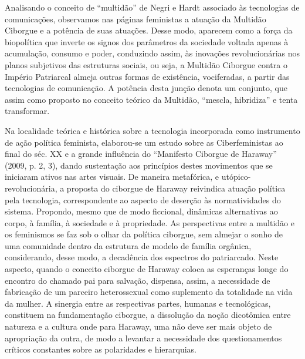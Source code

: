 Analisando o conceito de ``multidão'' de Negri e Hardt associado às
tecnologias de comunicações, observamos nas páginas feministas a atuação
da Multidão Ciborgue e a potência de suas atuações. Desse modo, aparecem
como a força da biopolítica que inverte os signos dos parâmetros da
sociedade voltada apenas à acumulação, consumo e poder, conduzindo
assim, às inovações revolucionárias nos planos subjetivos das estruturas
sociais, ou seja, a Multidão Ciborgue contra o Império Patriarcal almeja
outras formas de existência, vociferadas, a partir das tecnologias de
comunicação. A potência desta junção denota um conjunto, que assim como
proposto no conceito teórico da Multidão, ``mescla, hibridiza'' e tenta
transformar.

Na localidade teórica e histórica sobre a tecnologia incorporada como
instrumento de ação política feminista, elaborou-se um estudo sobre as
Ciberfeministas ao final do séc. XX e a grande influência do ``Manifesto
Ciborgue de Haraway'' (2009, p. 2, 3), dando sustentação aos princípios
destes movimentos que se iniciaram ativos nas artes visuais. De maneira
metafórica, e utópico-revolucionária, a proposta do ciborgue de Haraway
reivindica atuação política pela tecnologia, correspondente ao aspecto
de deserção às normatividades do sistema. Propondo, mesmo que de modo
ficcional, dinâmicas alternativas ao corpo, à família, à sociedade e à
propriedade. As perspectivas entre a multidão e os feminismos se faz sob
o olhar da política ciborgue, sem almejar o sonho de uma comunidade
dentro da estrutura de modelo de família orgânica, considerando, desse
modo, a decadência dos espectros do patriarcado. Neste aspecto, quando o
conceito ciborgue de Haraway coloca as esperanças longe do encontro do
chamado pai para salvação, dispensa, assim, a necessidade de fabricação
de um parceiro heterossexual como suplemento da totalidade na vida da
mulher. A sinergia entre as respectivas partes, humanas e tecnológicas,
constituem na fundamentação ciborgue, a dissolução da noção dicotômica
entre natureza e a cultura onde para Haraway, uma não deve ser mais
objeto de apropriação da outra, de modo a levantar a necessidade dos
questionamentos críticos constantes sobre as polaridades e hierarquias.

